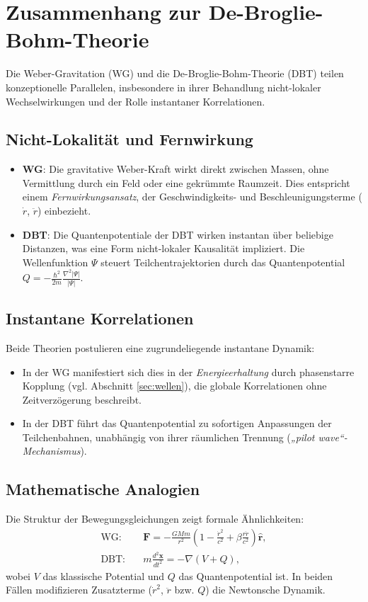 \section{Zusammenhang zur De-Broglie-Bohm-Theorie}
\label{sec:dbt}
Die Weber-Gravitation (WG) und die De-Broglie-Bohm-Theorie \cite{bohm1952} (DBT) teilen konzeptionelle Parallelen, insbesondere in ihrer Behandlung nicht-lokaler Wechselwirkungen und der Rolle instantaner Korrelationen. 

\subsection{Nicht-Lokalität und Fernwirkung}
\begin{itemize}
    \item \textbf{WG}: Die gravitative Weber-Kraft wirkt direkt zwischen Massen, ohne Vermittlung durch ein Feld oder eine gekrümmte Raumzeit. Dies entspricht einem \textit{Fernwirkungsansatz}, der Geschwindigkeits- und Beschleunigungsterme ($\dot{r}$, $\ddot{r}$) einbezieht.
    
    \item \textbf{DBT}: Die Quantenpotentiale der DBT wirken instantan über beliebige Distanzen, was eine Form nicht-lokaler Kausalität impliziert. Die Wellenfunktion $\Psi$ steuert Teilchentrajektorien durch das Quantenpotential $Q = -\frac{\hbar^2}{2m} \frac{\nabla^2 |\Psi|}{|\Psi|}$.
\end{itemize}

\subsection{Instantane Korrelationen}
Beide Theorien postulieren eine zugrundeliegende instantane Dynamik:
\begin{itemize}
    \item In der WG manifestiert sich dies in der \textit{Energieerhaltung} durch phasenstarre Kopplung (vgl. Abschnitt \ref{sec:wellen}), die globale Korrelationen ohne Zeitverzögerung beschreibt.
    
    \item In der DBT führt das Quantenpotential zu sofortigen Anpassungen der Teilchenbahnen, unabhängig von ihrer räumlichen Trennung (\textit{„pilot wave“-Mechanismus}).
\end{itemize}

\subsection{Mathematische Analogien}
Die Struktur der Bewegungsgleichungen zeigt formale Ähnlichkeiten:
\begin{align}
    \text{WG:} \quad & \mathbf{F} = -\frac{GMm}{r^2} \left(1 - \frac{\dot{r}^2}{c^2} + \beta \frac{r\ddot{r}}{c^2}\right) \hat{\mathbf{r}}, \\
    \text{DBT:} \quad & m \frac{d^2 \mathbf{x}}{dt^2} = -\nabla (V + Q), 
\end{align}
wobei $V$ das klassische Potential und $Q$ das Quantenpotential ist. In beiden Fällen modifizieren Zusatzterme ($\dot{r}^2$, $\ddot{r}$ bzw. $Q$) die Newtonsche Dynamik.

